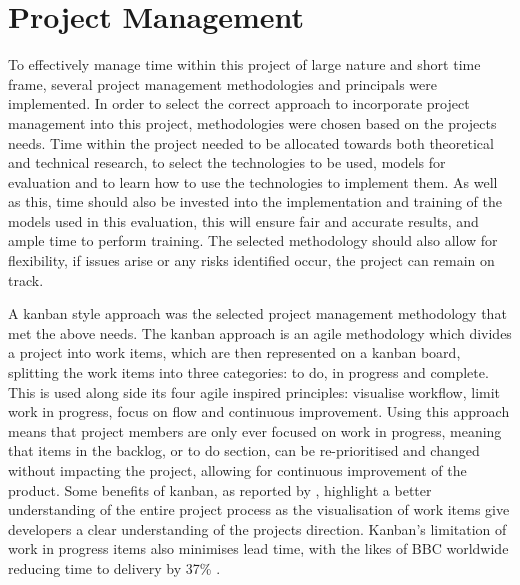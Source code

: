 \section{Project Management}

To effectively manage time within this project of large nature and short time frame, several project management methodologies and principals were implemented. In order to select the correct approach to incorporate project management into this project, methodologies were chosen based on the projects needs. Time within the project needed to be allocated towards both theoretical and technical research, to select the technologies to be used, models for evaluation and to learn how to use the technologies to implement them. As well as this, time should also be invested into the implementation and training of the models used in this evaluation, this will ensure fair and accurate results, and ample time to perform training. The selected methodology should also allow for flexibility, if issues arise or any risks identified occur, the project can remain on track.

A kanban style approach was the selected project management methodology that met the above needs. The kanban approach is an agile methodology which divides a project into work items, which are then represented on a kanban board, splitting the work items into three categories: to do, in progress and complete. This is used along side its four agile inspired principles: visualise workflow, limit work in progress, focus on flow and continuous improvement. Using this approach means that project members are only ever focused on work in progress, meaning that items in the backlog, or to do section, can be re-prioritised and changed without impacting the project, allowing for continuous improvement of the product. Some benefits of kanban, as reported by \cite{ahmad2013kanban}, highlight a better understanding of the entire project process as the visualisation of work items give developers a clear understanding of the projects direction. Kanban's limitation of work in progress items also minimises lead time, with the likes of BBC worldwide reducing time to delivery by 37\% \citep{senapathi2011factors}.

